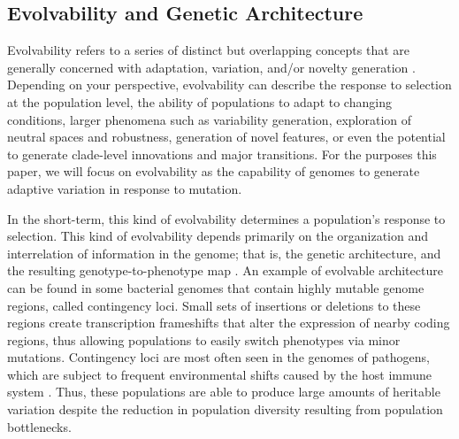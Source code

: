 \documentclass[10pt,letterpaper]{article}
\begin{document}
\subsection*{Evolvability and Genetic Architecture}
Evolvability refers to a series of distinct but overlapping concepts that are generally concerned with adaptation, variation, and/or novelty generation \cite{pigliucci_is_2008}. Depending on your perspective, evolvability can describe the response to selection at the population level\cite{fisher_genetical_1930,houle_comparing_1992}, the ability of populations to adapt to changing conditions\cite{belle_code_2002}, larger phenomena such as variability generation\cite{gunter_p._wagner_perspective:_1996}, 
exploration of neutral spaces and robustness\cite{andreas_wagner_robustness_2005,kitano_biological_2004}, 
generation of novel features\cite{alberch_genes_1991,brookfield_evolution:_2001}, 
or even the potential to generate clade-level innovations\cite{kirschner_evolvability_1998} 
and major transitions\cite{smith_major_1995}. For the purposes this paper, we will focus on evolvability as the capability of genomes to generate adaptive variation in response to mutation. 

In the short-term, this kind of evolvability determines a population's response to selection. This kind of evolvability depends primarily on the organization and interrelation of information in the genome; that is, the genetic architecture, and the resulting genotype-to-phenotype map \cite{gunter_p._wagner_perspective:_1996}. An example of evolvable architecture can be found in some bacterial genomes that contain highly mutable genome regions, called contingency loci. Small sets of insertions or deletions to these regions create transcription frameshifts that alter the expression of nearby coding regions, thus allowing populations to easily switch phenotypes via minor mutations. Contingency loci are most often seen in the genomes of pathogens, which are subject to frequent environmental shifts caused by the host immune system \cite{bayliss_simple_2001}. Thus, these populations are able to produce large amounts of heritable variation despite the reduction in population diversity resulting from population bottlenecks.
\end{document}
